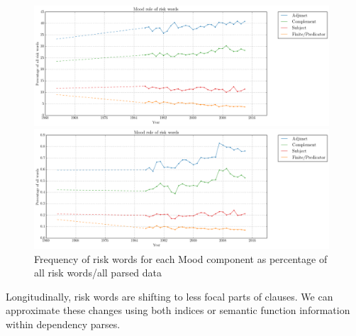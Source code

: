     \noindent
    \begin{figure}[htb!]
    \centering
    \begin{minipage}{.48\textwidth}
    \centering
    \includegraphics[width=0.98\textwidth]{../images/mood_role_of_risk_words_old.png}
    \end{minipage}%
    \begin{minipage}{.48\textwidth}
    \centering
    \includegraphics[width=0.98\textwidth]{../images/riskdep_allwords.png}
    \end{minipage}
    \caption{Frequency of risk words for each Mood component as percentage of all risk words\slash all parsed data}
    \label{fig:interpersonalarg}
    \end{figure}



    \vspace{5mm}\noindent\begin{tcolorbox}[colback=yellow!5,colframe=yellow!40!black,title=Summary: risk and arguability]
    \parbox{1\textwidth}{%
    Longitudinally, risk words are shifting to less focal parts of clauses. We can approximate these changes using both indices or semantic function information within dependency parses.}
    \end{tcolorbox}
    \vspace{5mm}

